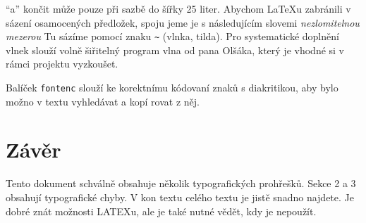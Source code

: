 \documentclass[twocolumn, 10pt, a4paper]{article}
\begin{document}
    \enquote{a} končit může pouze při sazbě do šířky 25 liter. Abychom
    \LaTeX u zabránili v sázení osamocených předložek, spoju\-
    jeme je s následujícím slovemi \textit{nezlomitelnou mezerou} Tu
    sázíme pomocí znaku \verb|~| (vlnka, tilda). Pro systematické
    doplnění vlnek slouží volně šiřitelný program vlna od pana
    Olšáka\footnotemark, který je vhodné si v rámci projektu vyzkoušet.

    Balíček \texttt{fontenc} slouží ke korektnímu kódovaní znaků
    s diakritikou, aby bylo možno v textu vyhledávat a kopí\-
    rovat z něj.
\section{Závěr}
Tento dokument schválně obsahuje několik typograﬁckých
prohřešků. Sekce 2 a 3 obsahují typograﬁcké chyby. V kon\-
textu celého textu je jistě snadno najdete. Je dobré znát
možnosti LATEXu, ale je také nutné vědět, kdy je nepoužít.
\end{document}
